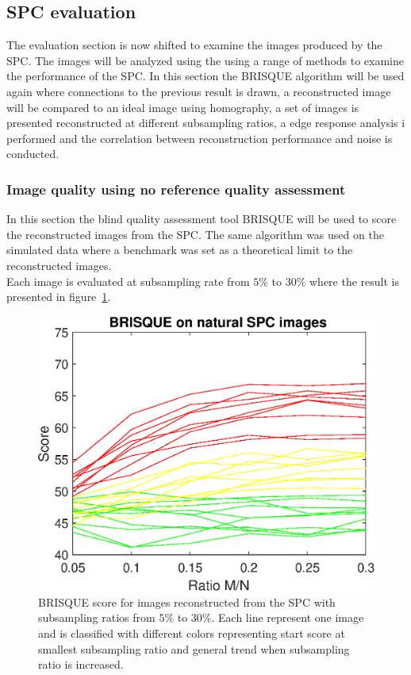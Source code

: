 

\subsection{SPC evaluation}
\label{sec:eval_spc}
The evaluation section is now shifted to examine the images produced by the SPC. The images will be analyzed using the using a range of methods to examine the performance of the SPC. In this section the BRISQUE algorithm will be used again where connections to the previous result is drawn, a reconstructed image will be compared to an ideal image using homography, a set of images is presented reconstructed at different subsampling ratios, a edge response analysis i performed and the correlation between reconstruction performance and noise is conducted. 



\subsubsection{Image quality using no reference quality assessment}
In this section the blind quality assessment tool BRISQUE will be used to score the reconstructed images from the SPC. The same algorithm was used on the simulated data where a benchmark was set as a theoretical limit to the reconstructed images.\\[0.1in]     

Each image is evaluated at subsampling rate from $5\%$ to $30\%$ where the result is presented in figure~\ref{fig:brisque_plot}.

\begin{figure}[H]
    \centering
    \includegraphics[width = 0.7\linewidth]{result/SPC_NRQA/brisque_spc.eps}
    \caption{BRISQUE score for images reconstructed from the SPC with subsampling ratios from $5\%$ to $30\%$. Each line represent one image and is classified with different colors representing start score at smallest subsampling ratio and general trend when subsampling ratio is increased.}
    \label{fig:brisque_plot}
\end{figure}


